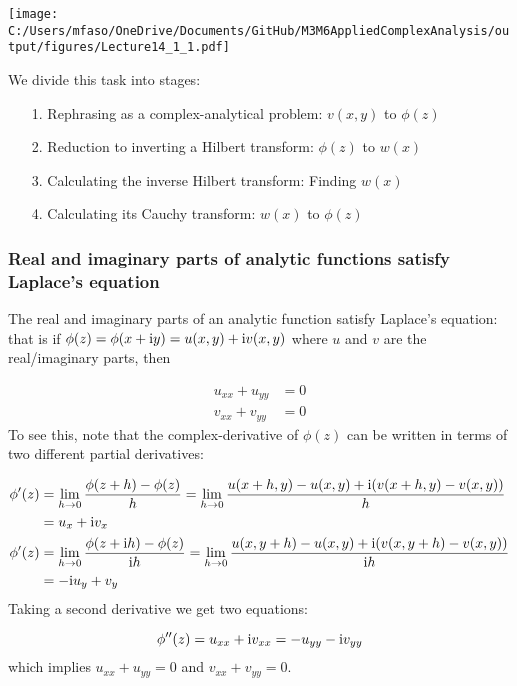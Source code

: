 \documentclass[12pt,landscape]{article}
\def\I{ {\rm i} }
\def\cent#1{\begin{center}#1\end{center} }
\begin{document}
{\cent{\texttt{[image: C:/Users/mfaso/OneDrive/Documents/GitHub/M3M6AppliedComplexAnalysis/output/figures/Lecture14\_1\_1.pdf]}}

We divide this task into stages:

\begin{itemize}
\item[1. ] Rephrasing as a complex-analytical problem: $v(x,y)$ to $\phi(z)$


\item[2. ] Reduction to inverting a Hilbert transform: $\phi(z)$ to $w(x)$


\item[3. ] Calculating the inverse Hilbert transform: Finding $w(x)$


\item[4. ] Calculating its Cauchy transform: $w(x)$ to $\phi(z)$

\end{itemize}
\subsubsection{Real and imaginary parts of analytic functions satisfy Laplace's equation}
The real and imaginary parts of an analytic function satisfy Laplace's equation: that is  if $\phi(z) = \phi(x + \I y) = u(x,y) + \I v(x,y)$ where $u$ and $v$ are the real/imaginary parts, then


\begin{align*}
 u_{xx} + u_{yy}&= 0 \\
 v_{xx} + v_{yy} &= 0 
\end{align*}
To see this, note that the complex-derivative of $\phi(z)$ can be written in terms of two different partial derivatives:


\begin{align*}
    \phi'(z) &= \lim_{h \rightarrow 0} {\phi(z+h) - \phi(z) \over h} = \lim_{h \rightarrow 0} {u(x+h,y)-u(x,y) + \I (v(x+h,y)-v(x,y)) \over h} \\& = u_x + \I v_x \\
    \phi'(z) &= \lim_{h \rightarrow 0} {\phi(z+\I h) - \phi(z) \over \I h} = \lim_{h \rightarrow 0} {u(x,y+h)-u(x,y) + \I (v(x,y+h)-v(x,y)) \over \I h}\\ & = - \I u_y + v_y
\end{align*}
Taking a second derivative we get two equations:

\[
    \phi''(z) = u_{xx} + \I v_{xx} = -u_{yy} -\I v_{yy}
\]
which implies $u_{xx} + u_{yy} = 0$ and $v_{xx} + v_{yy} = 0$.

}
\end{document}
